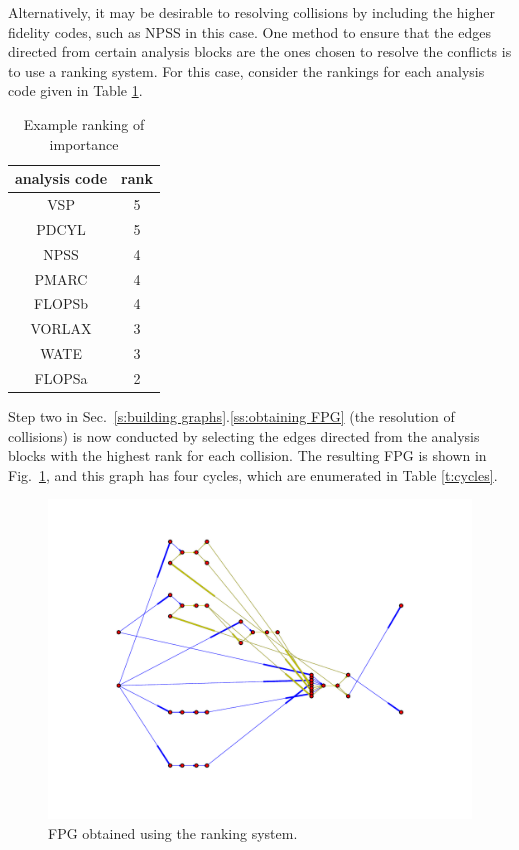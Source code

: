 	Alternatively, it may be desirable to resolving collisions by including the higher fidelity codes, such as NPSS in this case.
	One method to ensure that the edges directed from certain analysis blocks are the ones chosen to resolve the conflicts is to use a ranking system. For this case, consider the rankings for each analysis code given in Table \ref{t:rankings}.
	\begin{table}[htbp]
	  \centering
	  \caption{Example ranking of importance}
		\begin{tabular}{cc}
		\toprule
		analysis code & rank \\
		\midrule
		VSP   & 5 \\
		PDCYL & 5 \\
		NPSS  & 4 \\
		PMARC & 4 \\
		FLOPSb & 4 \\
		VORLAX & 3 \\
		WATE  & 3 \\
		FLOPSa & 2 \\
		\bottomrule
		\end{tabular}%
	  \label{t:rankings}%
	\end{table}%
	Step two in Sec.~\ref{s:building graphs}.\ref{ss:obtaining FPG} (the resolution of collisions) is now conducted by selecting the edges directed from the analysis blocks with the highest rank for each collision. The resulting FPG is shown in Fig.~\ref{f:FPG highest rank}, and this graph has four cycles, which are enumerated in Table \ref{t:cycles}.
	\begin{figure}[htb!]
	  \begin{center}
		\includegraphics[width=.6\textwidth]{images/FPG_highest_rank}
	  \end{center}
	  \caption{FPG obtained using the ranking system.}
	\label{f:FPG highest rank}
	\end{figure}
